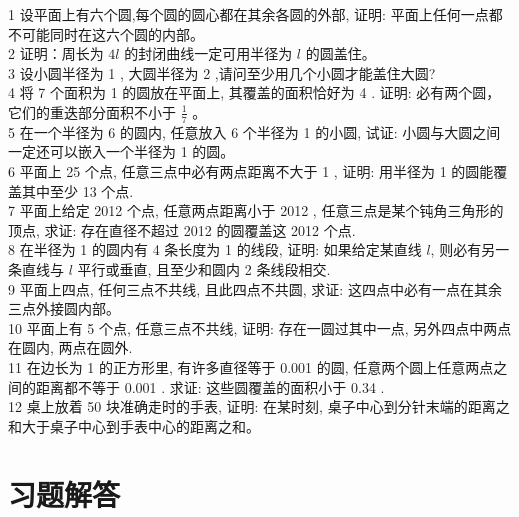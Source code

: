 \documentclass[10pt]{article}
\begin{document}
1 设平面上有六个圆,每个圆的圆心都在其余各圆的外部, 证明: 平面上任何一点都不可能同时在这六个圆的内部。\\
2 证明：周长为 $4 l$ 的封闭曲线一定可用半径为 $l$ 的圆盖住。\\
3 设小圆半径为 1 , 大圆半径为 2 ,请问至少用几个小圆才能盖住大圆?\\
4 将 7 个面积为 1 的圆放在平面上, 其覆盖的面积恰好为 4 . 证明: 必有两个圆，它们的重迭部分面积不小于 $\frac{1}{7}$ 。\\
5 在一个半径为 6 的圆内, 任意放入 6 个半径为 1 的小圆, 试证: 小圆与大圆之间一定还可以嵌入一个半径为 1 的圆。\\
6 平面上 25 个点, 任意三点中必有两点距离不大于 1 , 证明: 用半径为 1 的圆能覆盖其中至少 13 个点.\\
7 平面上给定 2012 个点, 任意两点距离小于 2012 , 任意三点是某个钝角三角形的顶点, 求证: 存在直径不超过 2012 的圆覆盖这 2012 个点.\\
8 在半径为 1 的圆内有 4 条长度为 1 的线段, 证明: 如果给定某直线 $l$, 则必有另一条直线与 $l$ 平行或垂直, 且至少和圆内 2 条线段相交.\\
9 平面上四点, 任何三点不共线, 且此四点不共圆, 求证: 这四点中必有一点在其余三点外接圆内部。\\
10 平面上有 5 个点, 任意三点不共线, 证明: 存在一圆过其中一点, 另外四点中两点在圆内, 两点在圆外.\\
11 在边长为 1 的正方形里, 有许多直径等于 0.001 的圆, 任意两个圆上任意两点之间的距离都不等于 0.001 . 求证: 这些圆覆盖的面积小于 0.34 .\\
12 桌上放着 50 块准确走时的手表, 证明: 在某时刻, 桌子中心到分针末端的距离之和大于桌子中心到手表中心的距离之和。

\section*{习题解答}
\end{document}
